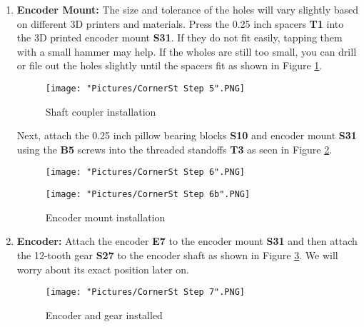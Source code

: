 \documentclass[12pt]{article}
\begin{document}
\begin{enumerate}
\item \textbf{Encoder Mount:} The size and tolerance of the holes will vary slightly based on different 3D printers and materials. Press the 0.25 inch 
spacers \textbf{T1} into the 3D printed encoder mount \textbf{S31}. If they do not fit easily, tapping them with a small hammer may help. 
If the wholes are still too small, you can drill or file out the holes slightly until the spacers fit as shown in Figure \ref{encoder mount 1}.

\begin{figure}[H]
  \centering
  \begin{minipage}[b]{0.45\textwidth}
    \texttt{[image: "Pictures/CornerSt Step 5".PNG]}
  \end{minipage}
  \caption{Shaft coupler installation}
  \label{encoder mount 1}
\end{figure}

Next, attach the 0.25 inch pillow bearing blocks \textbf{S10} and encoder mount \textbf{S31} using the \textbf{B5} screws into the threaded standoffs \textbf{T3} as seen in 
Figure \ref{encoder mount 2}.

\begin{figure}[H]
  \centering
  \begin{minipage}[b]{0.45\textwidth}
    \texttt{[image: "Pictures/CornerSt Step 6".PNG]}
  \end{minipage}
  \hfill
  \begin{minipage}[b]{0.45\textwidth}
    \texttt{[image: "Pictures/CornerSt Step 6b".PNG]}
  \end{minipage}
  \caption{Encoder mount installation}
  \label{encoder mount 2}
\end{figure}

\item \textbf{Encoder:} Attach the encoder \textbf{E7} to the encoder mount \textbf{S31} and then attach the 12-tooth gear \textbf{S27} to 
the encoder shaft as shown in Figure \ref{corner steering 4}. We will worry about its exact position later on.

\begin{figure}[H]
  \centering
  \begin{minipage}[b]{0.45\textwidth}
    \texttt{[image: "Pictures/CornerSt Step 7".PNG]}
  \end{minipage}
  \caption{Encoder and gear installed}
  \label{corner steering 4}
\end{figure}



\end{enumerate}
\end{document}
